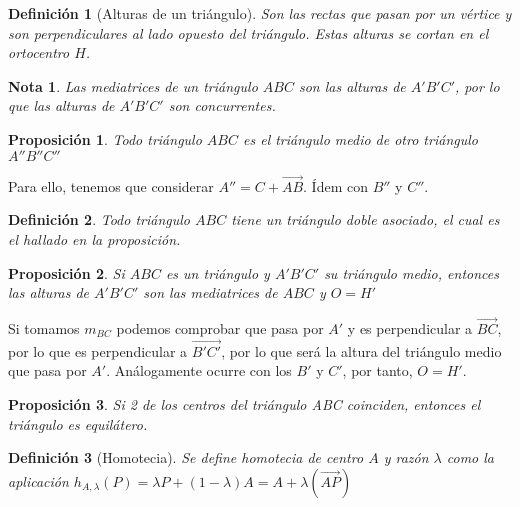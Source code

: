 \documentclass[11pt, a4paper]{article}
\makeatletter
\newif\IfInSansMode
\let\oldsf\sffamily
\renewcommand*{\sffamily}{\oldsf\mathversion{sans}\InSansModetrue}
\let\oldnorm\normalfont
\renewcommand*{\normalfont}{\oldnorm\InSansModefalse\mathversion{normal}}
\renewenvironment{proof}[1][\proofname] {\vspace{-15pt}\par\pushQED{\qed}\normalfont\topsep6\p@\@plus6\p@\relax\trivlist\item[\hskip\labelsep\it#1\@addpunct{.}]\ignorespaces}{\popQED\endtrivlist\@endpefalse}
\renewcommand{\vec}{\overrightarrow}
\renewenvironment{proof}[1][\proofname] {\par\pushQED{\qed}\normalfont\topsep6\p@\@plus6\p@\relax\trivlist\item[\hskip\labelsep\itshape\sffamily#1\@addpunct{.}]\ignorespaces}{\popQED\endtrivlist\@endpefalse}
\theoremstyle{theorem-style}
\newtheorem{nprop}{Proposición}[section]
\theoremstyle{definition-style}
\newtheorem{ndef}{Definición}[section]
\theoremstyle{remark-style}
\newtheorem*{nota}{Nota}
\theoremstyle{example-style}
\makeatother
\begin{document}
\begin{ndef}[Alturas de un triángulo]
  Son las rectas que pasan por un vértice y son perpendiculares al lado opuesto del triángulo. Estas alturas se cortan en el ortocentro $H$.
\end{ndef}

\begin{nota}
  Las mediatrices de un triángulo $ABC$ son las alturas de $A'B'C'$, por lo que las alturas de $A'B'C'$ son concurrentes.
\end{nota}

\begin{nprop}
  Todo triángulo $ABC$ es el triángulo medio de otro triángulo $A''B''C''$
\end{nprop}
\begin{proof}
  Para ello, tenemos que considerar $A'' = C+ \vec{AB}$. Ídem con $B''$ y $C''$.
\end{proof}
\begin{ndef}
  Todo triángulo $ABC$ tiene un triángulo doble asociado, el cual es el hallado en la proposición.
\end{ndef}


\begin{nprop}
  Si $ABC$ es un triángulo y $A'B'C'$ su triángulo medio, entonces las alturas de $A'B'C'$ son las mediatrices de $ABC$ y $O=H'$
\end{nprop}
\begin{proof}
  Si tomamos $m_{BC}$ podemos comprobar que pasa por $A'$ y es perpendicular a $\vec{BC}$, por lo que es perpendicular a $\vec{B'C'}$, por lo que será la altura del triángulo medio que pasa por $A'$. Análogamente ocurre con los $B'$ y $C'$, por tanto, $O=H'$.
\end{proof}


\begin{nprop}Si 2 de los centros del triángulo ABC coinciden, entonces el triángulo es equilátero.
\end{nprop}


\begin{ndef}[Homotecia]
  Se define homotecia de centro $A$ y razón $\lambda$ como la aplicación $h_{A,\lambda}(P) = \lambda P + (1-\lambda)A = A+\lambda(\vec{AP})$
\end{ndef}
\end{document}
